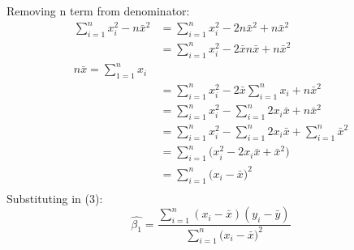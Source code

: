 \documentclass{article}
\begin{document}
Removing n term from denominator:
\begin{align*}
\sum_{i=1}^{n}x_i^2 - n\bar{x}^2 & = \sum_{i=1}^{n}x_i^2 - 2n\bar{x}^2 + n\bar{x}^2 \\ %
& = \sum_{i=1}^{n}x_i^2 - 2\bar{x}n\bar{x} + n\bar{x}^2 \\ %
n\bar{x} = \sum_{1=1}^{n}x_i \\ %
& = \sum_{i=1}^{n}x_i^2 - 2\bar{x}\sum_{i=1}^{n}x_i + n\bar{x}^2 \\
& = \sum_{i=1}^{n}x_i^2 - \sum_{i=1}^{n}2x_i\bar{x} + n\bar{x}^2 \\
& = \sum_{i=1}^{n}x_i^2 - \sum_{i=1}^{n}2x_i\bar{x} + \sum_{i=1}^{n}\bar{x}^2 \\
& = \sum_{i=1}^{n}\big(x_i^2 - 2x_i\bar{x} + \bar{x}^2\big) \\
& = \sum_{i=1}^{n}\big(x_i - \bar{x}\big)^2 \\
\end{align*}
Substituting in (3):
\begin{equation}
\hat{\beta_1}=  \frac{\sum_{i=1}^{n}(x_i - \bar{x})(y_i - \bar{y})}{\sum_{i=1}^{n}\big(x_i - \bar{x}\big)^2}  \label{eq:4}
\end{equation}
\end{document}
